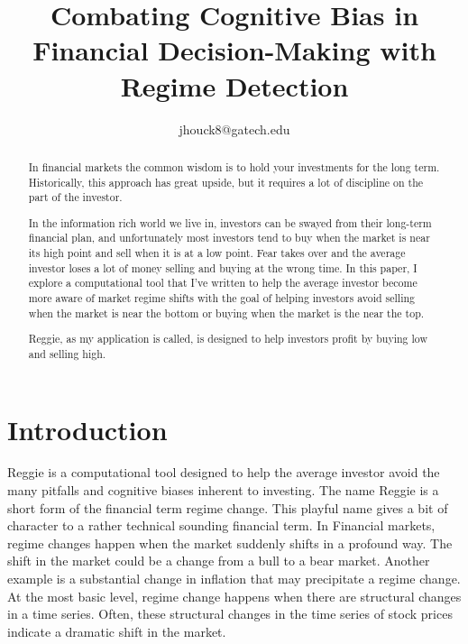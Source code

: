 \documentclass[conference]{IEEEtran}
\begin{document}
\title{Combating Cognitive Bias in Financial Decision-Making with Regime Detection \\
}

\author{
jhouck8@gatech.edu \\
}

\maketitle



\begin{abstract}
In financial markets the common wisdom is to hold your investments for the long term. Historically, this approach has great upside, but it requires a lot of discipline on the part of the investor. 

In the information rich world we live in, investors can be swayed from their long-term financial plan, and unfortunately most investors tend to buy when the market is near its high point and sell when it is at a low point. Fear takes over and the average investor loses a lot of money selling and buying at the wrong time. In this paper, I explore a computational tool that I've written to help the average investor become more aware of market regime shifts with the goal of helping investors avoid selling when the market is near the bottom or buying when the market is the near the top. 

Reggie, as my application is called, is designed to help investors profit by buying low and selling high. 
\end{abstract}


\section{Introduction}

Reggie is a computational tool designed to help the average investor avoid the many pitfalls and cognitive biases inherent to investing. The name Reggie is a short form of the financial term regime change. This playful name gives a bit of character to a rather technical sounding financial term. In Financial markets, regime changes happen when the market suddenly shifts in a profound way. The shift in the market could be a change from a bull to a bear market. Another example is a substantial change in inflation that may precipitate a regime change. At the most basic level, regime change happens when there are structural changes in a time series. Often, these structural changes in the time series of stock prices indicate a dramatic shift in the market.
\end{document}

